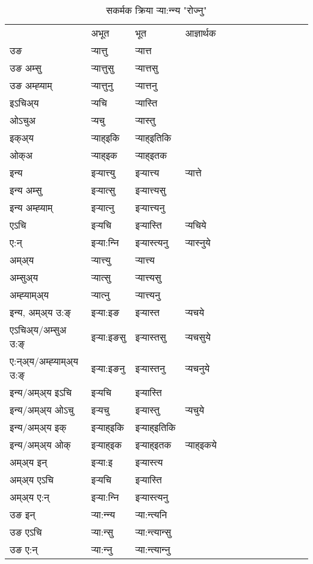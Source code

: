 \begin{table}[H]
\label{ɛtt.vt} \centering
\caption{सकर्मक क्रिया  र्‍या:न्‍न्य  "रोज्नु"  }
\begin{tabular}{l|l|l|l|l|l|l|l|l|l|l|l|l}  \toprule
&अभूत & भूत & आज्ञार्थक \\ 
उङ &र्‍यात्तु &र्‍यात्त \\ 
उङ अम्सु&र्‍यात्तुसु &र्‍यात्तसु \\ 
उङ अम्ह्‍याम्&र्‍यात्तुनु &र्‍यात्तनु \\ 
इऽचिअ्य &र्‍यचि &र्‍यास्ति   \\ 
ओऽचुअ        &र्‍यचु &र्‍यास्तु   \\ 
इक्अ्य&र्‍याह्इकि &र्‍याह्इतिकि   \\ 
ओक्अ &र्‍याह्इक &र्‍याह्इतक   \\ 
इन्य & इर्‍यात्त्यु  & इर्‍यात्त्य &र्‍यात्ते  \\ 
इन्य अम्सु& इर्‍यात्सु  & इर्‍यात्त्यसु   \\ 
इन्य अम्ह्‍याम्& इर्‍यात्‍नु  & इर्‍यात्त्यनु   \\ 
एऽचि & इर्‍यचि & इर्‍यास्ति &र्‍यचिये    \\ 
ए:न् & इर्‍या:न्‍नि  & इर्‍यास्त्यनु &र्‍यास्‍नुये  \\ 
अम्अ्य & र्‍यात्त्यु  & र्‍यात्त्य  \\ 
अम्सुअ्य & र्‍यात्सु & र्‍यात्त्यसु  \\ 
अम्ह्‍याम्अ्य & र्‍यात्‍नु  & र्‍यात्त्यनु \\ 
\midrule
इन्य, अम्अ्य उ:ङ्‌ &इर्‍या:इङ &इर्‍यास्त &र्‍यचये \\ 
एऽचिअ्य/अम्सुअ उ:ङ्‌ &इर्‍या:इङसु &इर्‍यास्तसु &र्‍यचसुये \\ 
ए:न्अ्य/अम्ह्‍याम्अ्य उ:ङ्‌ &इर्‍या:इङनु &इर्‍यास्तनु &र्‍यचनुये \\ 
इन्य/अम्अ्य इऽचि &इर्‍यचि &इर्‍यास्ति    \\ 
इन्य/अम्अ्य ओऽचु &इर्‍यचु &इर्‍यास्तु  &र्‍यचुये  \\ 
इन्य/अम्अ्य इक् &इर्‍याह्इकि &इर्‍याह्इतिकि   \\ 
इन्य/अम्अ्य ओक् &इर्‍याह्इक &इर्‍याह्इतक  &र्‍याह्इकये  \\ 
अम्अ्य इन् & इर्‍या:इ & इर्‍यास्त्य   \\ 
अम्अ्य एऽचि & इर्‍यचि & इर्‍यास्ति    \\ 
अम्अ्य ए:न् & इर्‍या:न्‍नि  & इर्‍यास्त्यनु  \\ 
\midrule
उङ इन् & र्‍या:न्‍न्य  & र्‍या:न्त्यनि  \\ 
उङ एऽचि & र्‍या:न्सु  & र्‍या:न्त्यान्सु   \\ 
उङ ए:न्& र्‍या:न्‍नु  & र्‍या:न्त्यान्‍नु   \\ 
\bottomrule
\end{tabular}
\end{table}



